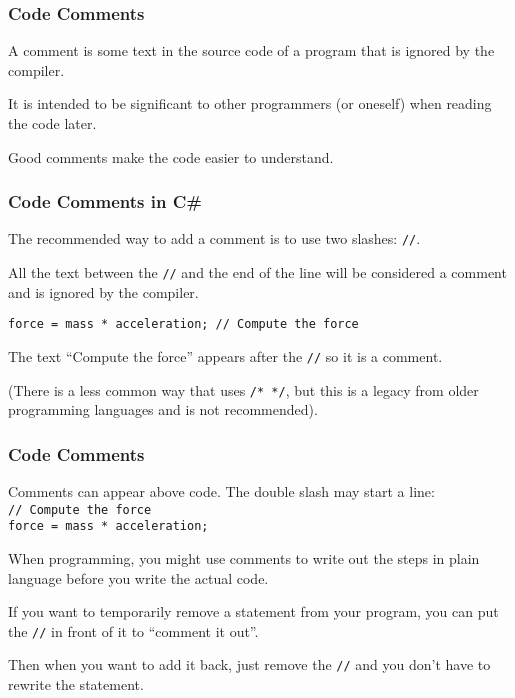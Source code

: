 %
%
%
%


\begin{frame}
\frametitle{Code Comments}
A comment is some text in the source code of a program that is ignored by the compiler.

It is intended to be significant to other programmers (or oneself) when reading the code later.

Good comments make the code easier to understand.

\end{frame}

\begin{frame}
\frametitle{Code Comments in C\#}

The recommended way to add a comment is to use two slashes: \texttt{//}.

All the text between the \texttt{//} and the end of the line will be considered a comment and is ignored by the compiler.

\texttt{force = mass * acceleration; // Compute the force}

The text ``Compute the force'' appears after the \texttt{//} so it is a comment.

(There is a less common way that uses \texttt{/* */}, but this is a legacy from older programming languages and is not recommended).

\end{frame}

\begin{frame}
\frametitle{Code Comments}
Comments can appear above code. The double slash may start a line:\\
\texttt{// Compute the force}\\
\texttt{force = mass * acceleration; }

When programming, you might use comments to write out the steps in plain language before you write the actual code.

If you want to temporarily remove a statement from your program, you can put the \texttt{//} in front of it to ``comment it out''.

Then when you want to add it back, just remove the \texttt{//} and you don't have to rewrite the statement.

\end{frame}

